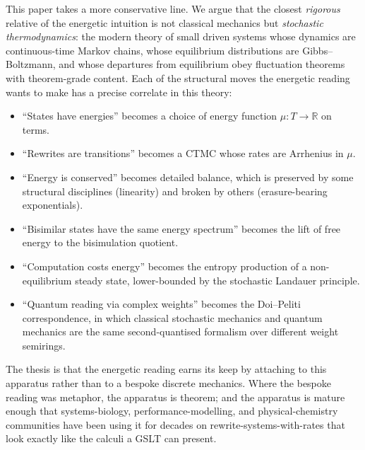 \documentclass[11pt]{article}
\theoremstyle{plain}
\theoremstyle{definition}
\theoremstyle{remark}
\newcommand{\R}{\mathbb{R}}
\begin{document}
This paper takes a more conservative line. We argue that the closest \emph{rigorous} relative of the energetic intuition is not classical mechanics but \emph{stochastic thermodynamics}: the modern theory of small driven systems whose dynamics are continuous-time Markov chains, whose equilibrium distributions are Gibbs--Boltzmann, and whose departures from equilibrium obey fluctuation theorems with theorem-grade content. Each of the structural moves the energetic reading wants to make has a precise correlate in this theory:

\begin{itemize}
\item ``States have energies'' becomes a choice of energy function $\mu : T \to \R$ on terms.
\item ``Rewrites are transitions'' becomes a CTMC whose rates are Arrhenius in $\mu$.
\item ``Energy is conserved'' becomes detailed balance, which is preserved by some structural disciplines (linearity) and broken by others (erasure-bearing exponentials).
\item ``Bisimilar states have the same energy spectrum'' becomes the lift of free energy to the bisimulation quotient.
\item ``Computation costs energy'' becomes the entropy production of a non-equilibrium steady state, lower-bounded by the stochastic Landauer principle.
\item ``Quantum reading via complex weights'' becomes the Doi--Peliti correspondence, in which classical stochastic mechanics and quantum mechanics are the same second-quantised formalism over different weight semirings.
\end{itemize}

The thesis is that the energetic reading earns its keep by attaching to this apparatus rather than to a bespoke discrete mechanics. Where the bespoke reading was metaphor, the apparatus is theorem; and the apparatus is mature enough that systems-biology, performance-modelling, and physical-chemistry communities have been using it for decades on rewrite-systems-with-rates that look exactly like the calculi a GSLT can present.
\end{document}
